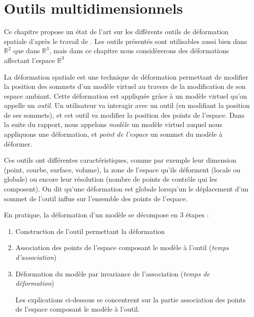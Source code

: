 

\chapter{Outils multidimensionnels}

\graphicspath{{Chapter1/Chapter1Figs/PNG/}{Chapter1/Chapter1Figs/PDF/}{Chapter1/Chapter1Figs/}}

Ce chapitre propose un état de l'art sur les différents outils de déformation
spatiale d'après le travail de \cite{GB08}. Les outils présentés sont
utilisables aussi bien dans $\mathbb{R}^2$ que dans $\mathbb{R}^3$, mais dans
ce chapitre nous considèrerons des déformations affectant l'espace
$\mathbb{R}^3$

La déformation spatiale est une technique de déformation permettant de
modifier la position des sommets d'un modèle virtuel au travers de la
modification de son espace ambiant. Cette déformation est appliquée grâce à un
modèle virtuel qu'on appelle un \textit{outil}. Un utilisateur va interagir
avec un outil (en modifiant la position de ses sommets), et cet outil va
modifier la position des points de l'espace. Dans la suite du rapport, nous
appelons \textit{modèle} un modèle virtuel auquel nous appliquons une
déformation, et \textit{point de l'espace} un sommet du modèle à déformer.

Ces outils ont différentes caractéristiques, comme par exemple leur dimension
(point, courbe, surface, volume), la zone de l'espace qu'ils déforment (locale
ou globale) ou encore leur résolution (nombre de points de contrôle qui les
composent). On dit qu'une déformation est globale lorsqu'un le déplacement
d'un sommet de l'outil influe sur l'ensemble des points de l'espace.

En pratique, la déformation d'un modèle se décompose en 3 étapes :
\begin{enumerate}

\item Construction de l'outil permettant la déformation

\item Association des points de l'espace composant le modèle à l'outil
(\textit{temps d'association})

\item Déformation du modèle par invariance de l'association (\textit{temps de
déformation})

Les explications ci-dessous se concentrent sur la partie association des
points de l'espace composant le modèle à l'outil.

\end{enumerate} 

